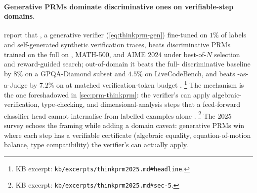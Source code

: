 \paragraph{Generative PRMs dominate discriminative ones on
verifiable-step domains.}  report that , a
generative verifier (\cref{eq:thinkprm-gen}) fine-tuned on $1\%$ of
 labels and self-generated synthetic verification traces,
beats discriminative PRMs trained on the full  on ,
MATH-500, and AIME 2024 under best-of-$N$ selection and reward-guided
search; out-of-domain it beats the full- discriminative baseline
by $8\%$ on a GPQA-Diamond subset and $4.5\%$ on
LiveCodeBench, and beats -as-a-Judge by $7.2\%$ on  at
matched verification-token budget \citep[abstract]{thinkprm2025}.%
\footnote{KB excerpt: \nolinkurl{kb/excerpts/thinkprm2025.md#headline}.}
The mechanism is the one foreshadowed in \cref{sec:prm-thinkprm}: the
verifier's  can apply algebraic-verification, type-checking, and
dimensional-analysis steps that a feed-forward classifier head cannot
internalise from labelled examples alone \citep[\S 5]{thinkprm2025}.%
\footnote{KB excerpt: \nolinkurl{kb/excerpts/thinkprm2025.md#sec-5}.} The
2025  survey \citep{zheng2025-prm-survey} echoes the framing while
adding a domain caveat: generative PRMs win where each step has a
verifiable certificate (algebraic equality, equation-of-motion balance,
type compatibility) the verifier's  can actually
apply.

